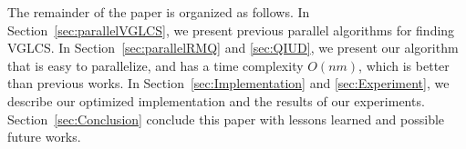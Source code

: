 The remainder of the paper is organized as follows.  In
Section~\ref{sec:parallelVGLCS}, we present previous parallel algorithms
for finding VGLCS.  In Section~\ref{sec:parallelRMQ} and \ref{sec:QIUD},
we present our algorithm that is easy to parallelize, and has a time
complexity $O(nm)$, which is better than previous works.  In
Section~\ref{sec:Implementation} and \ref{sec:Experiment}, we describe
our optimized implementation and the results of our experiments.
Section~\ref{sec:Conclusion} conclude this paper with lessons learned
and possible future works.

